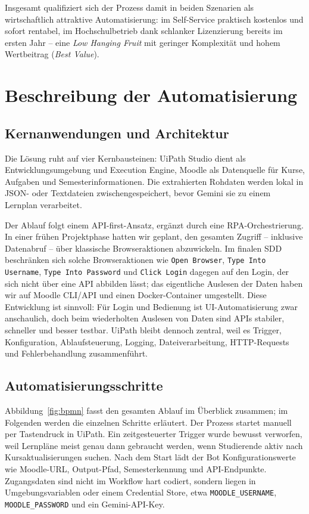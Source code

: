 \documentclass[11pt]{scrartcl}
\begin{document}
Insgesamt qualifiziert sich der Prozess damit in beiden Szenarien als wirtschaftlich attraktive Automatisierung: im Self-Service praktisch kostenlos und sofort rentabel, im Hochschulbetrieb dank schlanker Lizenzierung bereits im ersten Jahr -- eine \textit{Low Hanging Fruit} mit geringer Komplexität und hohem Wertbeitrag (\textit{Best Value}).

\section{Beschreibung der Automatisierung}
\subsection{Kernanwendungen und Architektur}
Die Lösung ruht auf vier Kernbausteinen: UiPath Studio dient als Entwicklungsumgebung und Execution Engine, Moodle als Datenquelle für Kurse, Aufgaben und Semesterinformationen. Die extrahierten Rohdaten werden lokal in JSON- oder Textdateien zwischengespeichert, bevor Gemini sie zu einem Lernplan verarbeitet.

Der Ablauf folgt einem API-first-Ansatz, ergänzt durch eine RPA-Orchestrierung. In einer frühen Projektphase hatten wir geplant, den gesamten Zugriff -- inklusive Datenabruf -- über klassische Browseraktionen abzuwickeln. Im finalen SDD beschränken sich solche Browseraktionen wie \texttt{Open Browser}, \texttt{Type Into Username}, \texttt{Type Into Password} und \texttt{Click Login} dagegen auf den Login, der sich nicht über eine API abbilden lässt; das eigentliche Auslesen der Daten haben wir auf Moodle CLI/API und einen Docker-Container umgestellt. Diese Entwicklung ist sinnvoll: Für Login und Bedienung ist UI-Automatisierung zwar anschaulich, doch beim wiederholten Auslesen von Daten sind APIs stabiler, schneller und besser testbar. UiPath bleibt dennoch zentral, weil es Trigger, Konfiguration, Ablaufsteuerung, Logging, Dateiverarbeitung, HTTP-Requests und Fehlerbehandlung zusammenführt.

\subsection{Automatisierungsschritte}
\label{sec:automatisierungsschritte}
Abbildung~\ref{fig:bpmn} fasst den gesamten Ablauf im Überblick zusammen; im Folgenden werden die einzelnen Schritte erläutert. Der Prozess startet manuell per Tastendruck in UiPath. Ein zeitgesteuerter Trigger wurde bewusst verworfen, weil Lernpläne meist genau dann gebraucht werden, wenn Studierende aktiv nach Kursaktualisierungen suchen. Nach dem Start lädt der Bot Konfigurationswerte wie Moodle-URL, Output-Pfad, Semesterkennung und API-Endpunkte. Zugangsdaten sind nicht im Workflow hart codiert, sondern liegen in Umgebungsvariablen oder einem Credential Store, etwa \texttt{MOODLE\_USERNAME}, \texttt{MOODLE\_PASSWORD} und ein Gemini-API-Key.
\end{document}
